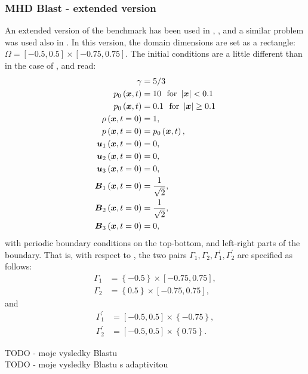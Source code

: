 \subsubsection{MHD Blast - extended version}
\label{sec:blastNew}
An extended version of the benchmark has been used in \cite{blastNew1}, \cite{athenaBlast}, and a similar problem was used also in \cite{blastNew2}.
In this version, the domain dimensions are set as a rectangle: $\Omega = [-0.5, 0.5] \times [-0.75, 0.75]$.
The initial conditions are a little different than in the case of , and read:
\begin{align}
\label{mhdBlastNew}
\gamma & =  5 / 3\\ \nonumber
p_0\left(\mbox{\boldmath $x$}, t\right) & =  10\ \ \text{for}\ \left|\mbox{\boldmath $x$}\right| < 0.1\\ \nonumber
p_0\left(\mbox{\boldmath $x$}, t\right) & =  0.1\ \ \text{for}\ \left|\mbox{\boldmath $x$}\right| \geq 0.1\\ \nonumber
\rho\left(\mbox{\boldmath $x$}, t = 0\right) & =  1,\\ \nonumber
p\left(\mbox{\boldmath $x$}, t = 0\right) & =  p_0\left(\mbox{\boldmath $x$}, t\right),\\ \nonumber
\mbox{\boldmath $u$}_1\left(\mbox{\boldmath $x$}, t = 0\right) & =  0,\\ \nonumber
\mbox{\boldmath $u$}_2\left(\mbox{\boldmath $x$}, t = 0\right) & =  0,\\ \nonumber
\mbox{\boldmath $u$}_3\left(\mbox{\boldmath $x$}, t = 0\right) & =  0,\\ \nonumber
\mbox{\boldmath $B$}_1\left(\mbox{\boldmath $x$}, t = 0\right) & =  \frac{1}{\sqrt{2}},\\ \nonumber
\mbox{\boldmath $B$}_2\left(\mbox{\boldmath $x$}, t = 0\right) & =  \frac{1}{\sqrt{2}},\\ \nonumber
\mbox{\boldmath $B$}_3\left(\mbox{\boldmath $x$}, t = 0\right) & =  0,
\end{align}
with periodic boundary conditions on the top-bottom, and left-right parts of the boundary. That is, with respect to , the two pairs $\Gamma_1, \Gamma_2, \Gamma_1^{'}, \Gamma_2^{'}$ are specified as follows:
\begin{align}
\Gamma_1 & = \left\{-0.5\right\} \times [-0.75, 0.75],\\
\Gamma_2 & = \left\{0.5\right\} \times [-0.75, 0.75],
\end{align}
and
\begin{align}
\Gamma_1^{'} & = [-0.5, 0.5] \times \left\{-0.75\right\},\\
\Gamma_2^{'} & = [-0.5, 0.5] \times \left\{0.75\right\}.
\end{align}


TODO - moje vysledky Blastu\\
TODO - moje vysledky Blastu s adaptivitou\\

